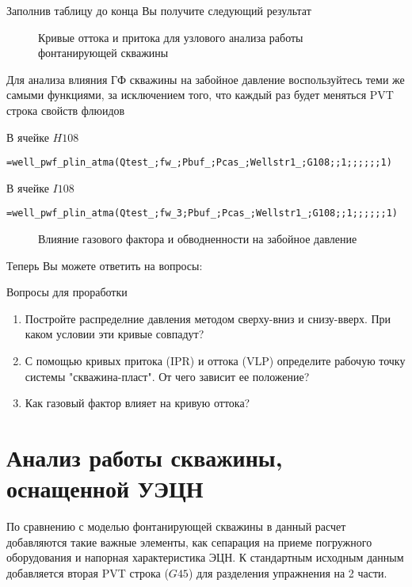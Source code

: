 Заполнив таблицу до конца Вы получите следующий результат

\begin{figure}[h!]
	\center{\texttt{[image: Ex90\_3]}}
	\caption{Кривые оттока и притока для узлового анализа работы фонтанирующей скважины}
	\label{ris:Ex90_3}
\end{figure}

Для анализа влияния ГФ скважины на забойное давление воспользуйтесь теми же самыми функциями, за исключением того, что каждый раз будет меняться PVT строка свойств флюидов

В ячейке $H108$ 

{ \small  \texttt{=well\_pwf\_plin\_atma(Qtest\_;fw\_;Pbuf\_;Pcas\_;Wellstr1\_;G108;;1;;;;;;1)}}

В ячейке $I108$ 

{ \small  \texttt{=well\_pwf\_plin\_atma(Qtest\_;fw\_3;Pbuf\_;Pcas\_;Wellstr1\_;G108;;1;;;;;;1)}}

\begin{figure}[h!]
	\center{\texttt{[image: Ex90\_4]}}
	\caption{Влияние газового фактора и обводненности на забойное давление}
	\label{ris:Ex90_4}
\end{figure}

Теперь Вы можете ответить на вопросы:

Вопросы для проработки

\begin{enumerate}
	\item Постройте распределние давления методом сверху-вниз и снизу-вверх. При каком условии эти кривые совпадут?
	\item С помощью кривых притока  (IPR) и оттока (VLP) определите рабочую точку системы "скважина-пласт". От чего зависит ее положение?
	\item Как газовый фактор влияет на кривую оттока?
\end{enumerate}

\section{Анализ работы скважины, оснащенной УЭЦН}

По сравнению с моделью фонтанирующей скважины в данный расчет добавляются такие важные элементы, как сепарация на приеме погружного оборудования и напорная характеристика ЭЦН. К стандартным исходным данным добавляется вторая PVT строка ($G45$) для разделения упражнения на 2 части. 

